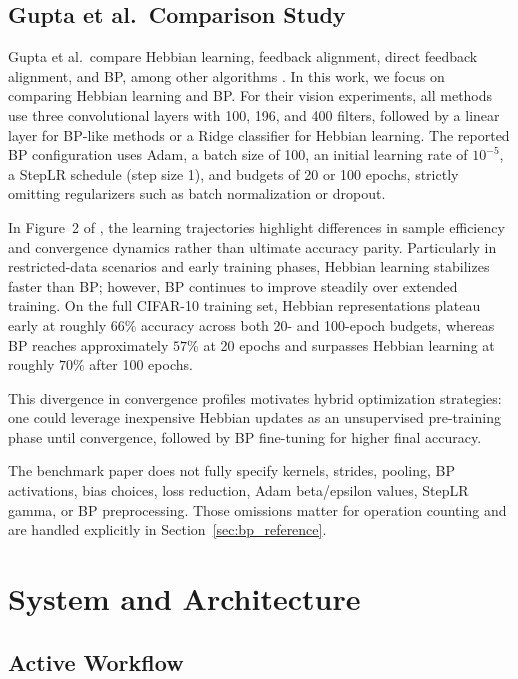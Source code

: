 \documentclass{article}
\begin{document}
    \subsection{Gupta et al.\ Comparison Study}
    
    Gupta et al.\ compare Hebbian learning, feedback alignment, direct feedback alignment, and BP, among other algorithms \citep{gupta2023bio}. In this work, we focus on comparing Hebbian learning and BP. For their vision experiments, all methods use three convolutional layers with 100, 196, and 400 filters, followed by a linear layer for BP-like methods or a Ridge classifier for Hebbian learning. The reported BP configuration uses Adam, a batch size of 100, an initial learning rate of $10^{-5}$, a StepLR schedule (step size 1), and budgets of 20 or 100 epochs, strictly omitting regularizers such as batch normalization or dropout.

In Figure~2 of \citet{gupta2023bio}, the learning trajectories highlight differences in sample efficiency and convergence dynamics rather than ultimate accuracy parity. Particularly in restricted-data scenarios and early training phases, Hebbian learning stabilizes faster than BP; however, BP continues to improve steadily over extended training. On the full CIFAR-10 training set, Hebbian representations plateau early at roughly $66\%$ accuracy across both 20- and 100-epoch budgets, whereas BP reaches approximately $57\%$ at 20 epochs and surpasses Hebbian learning at roughly $70\%$ after 100 epochs.

    This divergence in convergence profiles motivates hybrid optimization strategies: one could leverage inexpensive Hebbian updates as an unsupervised pre-training phase until convergence, followed by BP fine-tuning for higher final accuracy.
    
    The benchmark paper does not fully specify kernels, strides, pooling, BP activations, bias choices, loss reduction, Adam beta/epsilon values, StepLR gamma, or BP preprocessing. Those omissions matter for operation counting and are handled explicitly in Section~\ref{sec:bp_reference}.
    
    \section{System and Architecture}
    
    \subsection{Active Workflow}
    
\end{document}
